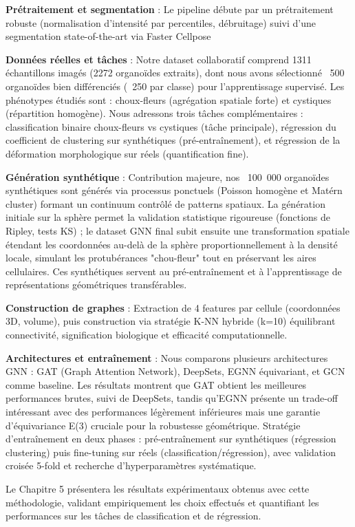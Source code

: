 \textbf{Prétraitement et segmentation} : Le pipeline débute par un prétraitement robuste (normalisation d'intensité par percentiles, débruitage) suivi d'une segmentation state-of-the-art via Faster Cellpose

\textbf{Données réelles et tâches} : Notre dataset collaboratif comprend 1311 échantillons imagés (2272 organoïdes extraits), dont nous avons sélectionné ~500 organoïdes bien différenciés (~250 par classe) pour l'apprentissage supervisé. Les phénotypes étudiés sont : choux-fleurs (agrégation spatiale forte) et cystiques (répartition homogène). Nous adressons trois tâches complémentaires : classification binaire choux-fleurs vs cystiques (tâche principale), régression du coefficient de clustering sur synthétiques (pré-entraînement), et régression de la déformation morphologique sur réels (quantification fine).

\textbf{Génération synthétique} : Contribution majeure, nos ~100~000 organoïdes synthétiques sont générés via processus ponctuels (Poisson homogène et Matérn cluster) formant un continuum contrôlé de patterns spatiaux. La génération initiale sur la sphère permet la validation statistique rigoureuse (fonctions de Ripley, tests KS) ; le dataset GNN final subit ensuite une transformation spatiale étendant les coordonnées au-delà de la sphère proportionnellement à la densité locale, simulant les protubérances "chou-fleur" tout en préservant les aires cellulaires. Ces synthétiques servent au pré-entraînement et à l'apprentissage de représentations géométriques transférables.

\textbf{Construction de graphes} : Extraction de 4 features par cellule (coordonnées 3D, volume), puis construction via stratégie K-NN hybride (k=10) équilibrant connectivité, signification biologique et efficacité computationnelle.

\textbf{Architectures et entraînement} : Nous comparons plusieurs architectures GNN : GAT (Graph Attention Network), DeepSets, EGNN équivariant, et GCN comme baseline. Les résultats montrent que GAT obtient les meilleures performances brutes, suivi de DeepSets, tandis qu'EGNN présente un trade-off intéressant avec des performances légèrement inférieures mais une garantie d'équivariance E(3) cruciale pour la robustesse géométrique. Stratégie d'entraînement en deux phases : pré-entraînement sur synthétiques (régression clustering) puis fine-tuning sur réels (classification/régression), avec validation croisée 5-fold et recherche d'hyperparamètres systématique.

Le Chapitre 5 présentera les résultats expérimentaux obtenus avec cette méthodologie, validant empiriquement les choix effectués et quantifiant les performances sur les tâches de classification et de régression.
